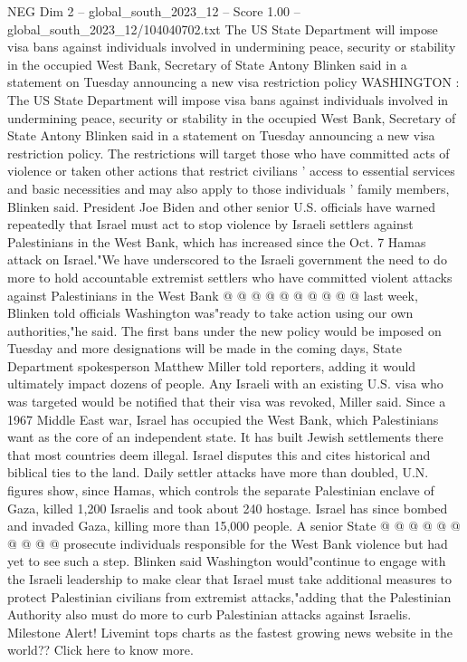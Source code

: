 \begin{textsample}{NEG Dim 2 – global\_south\_2023\_12 – Score 1.00 – global\_south\_2023\_12/104040702.txt}  \label{ex:f2_neg_422}
The US State Department will impose visa bans against individuals involved in undermining peace, security or stability in the occupied West Bank, Secretary of State Antony Blinken said in a statement on Tuesday announcing a new visa restriction policy WASHINGTON : The US State Department will impose visa bans against individuals involved in undermining peace, security or stability in the occupied West Bank, Secretary of State Antony Blinken said in a statement on Tuesday announcing a new visa restriction policy.
The restrictions will target those who have committed acts of violence or taken other actions that restrict civilians ' access to essential services and basic necessities and may also apply to those individuals ' family members, Blinken said.
President Joe Biden and other senior U.S. officials have warned repeatedly that Israel must act to stop violence by Israeli settlers against Palestinians in the West Bank, which has increased since the Oct. 7 Hamas attack on Israel."We have underscored to the Israeli government the need to do more to hold accountable extremist settlers who have committed violent attacks against Palestinians in the West Bank @ @ @ @ @ @ @ @ @ @ last week, Blinken told officials Washington was"ready to take action using our own authorities,"he said.
The first bans under the new policy would be imposed on Tuesday and more designations will be made in the coming days, State Department spokesperson Matthew Miller told reporters, adding it would ultimately impact dozens of people.
Any Israeli with an existing U.S. visa who was targeted would be notified that their visa was revoked, Miller said.
Since a 1967 Middle East war, Israel has occupied the West Bank, which Palestinians want as the core of an independent state.
It has built Jewish settlements there that most countries deem illegal.
Israel disputes this and cites historical and biblical ties to the land.
Daily settler attacks have more than doubled, U.N. figures show, since Hamas, which controls the separate Palestinian enclave of Gaza, killed 1,200 Israelis and took about 240 hostage.
Israel has since bombed and invaded Gaza, killing more than 15,000 people.
A senior State @ @ @ @ @ @ @ @ @ @ prosecute individuals responsible for the West Bank violence but had yet to see such a step.
Blinken said Washington would"continue to engage with the Israeli leadership to make clear that Israel must take additional measures to protect Palestinian civilians from extremist attacks,"adding that the Palestinian Authority also must do more to curb Palestinian attacks against Israelis.
Milestone Alert!
Livemint tops charts as the fastest growing news website in the world??
Click here to know more.

\end{textsample}
